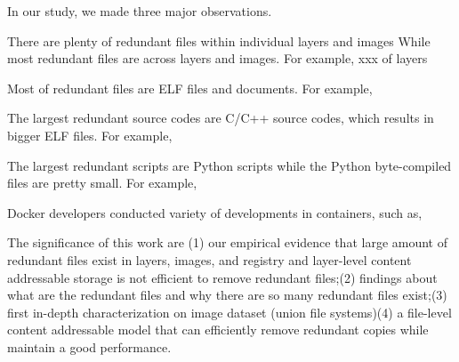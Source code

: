 In our study, we made three major observations.
\begin{compactitemize}
	\item There are plenty of redundant files within individual layers and images 
	While most redundant files are across layers and images. For example, xxx of layers
	\item Most of redundant files are ELF files and documents. For example, 
	\item The largest redundant source codes are C/C++ source codes, which results in bigger ELF files. For example, 
	\item The largest redundant scripts are Python scripts while the Python byte-compiled files are pretty small. For example, 
	\item Docker developers conducted variety of developments in containers, such as,
	 
\end{compactitemize}

The significance of this work are (1) our empirical evidence that large amount of redundant files exist in layers, images, and registry and layer-level content addressable storage is not efficient to remove redundant files;(2) findings about what are the redundant files and why there are so many redundant files exist;(3) first in-depth characterization on image dataset (union file systems)(4) a file-level content addressable model that can efficiently remove redundant copies while maintain a good performance.



